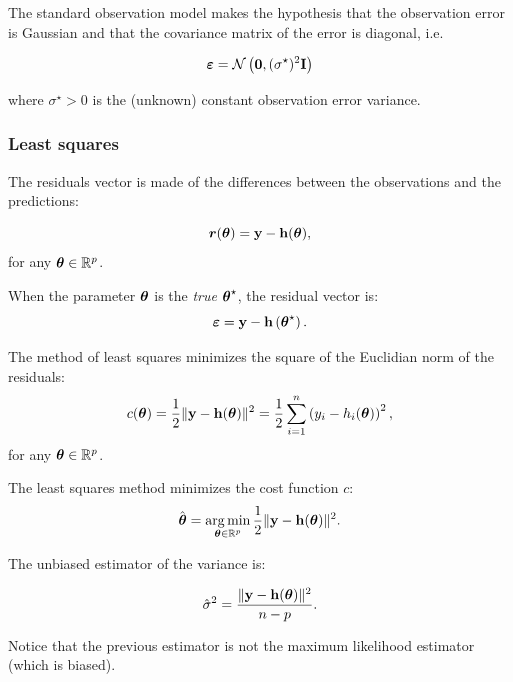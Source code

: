 \documentclass{beamer}
\begin{document}

\begin{frame}
The standard observation model makes the hypothesis that the 
observation error is Gaussian and that the covariance
matrix of the error is diagonal, i.e.

$$
\boldsymbol{\varepsilon} = \mathcal{N}\left({\bf 0}, (\sigma^\star)^2 {\bf I}\right)
$$

where $\sigma^\star > 0$ is the (unknown) constant observation error
variance.

\end{frame}


\begin{frame}
\frametitle{Least squares}

The residuals vector is made of the differences between the observations 
and the predictions:

$$
\boldsymbol{r}(\boldsymbol{\theta}) = {\bf y} - {\bf h}(\boldsymbol{\theta}),
$$
for any $\boldsymbol{\theta} \in\mathbb{R}^p$. 

When the parameter $\boldsymbol{\theta}$ is the \emph{true} $\boldsymbol{\theta}^\star$, the residual 
vector is:
$$
\boldsymbol{\varepsilon} = {\bf y} - {\bf h}\left(\boldsymbol{\theta}^\star\right).
$$


The method of least squares minimizes the square
of the Euclidian norm of the residuals:
$$
c(\boldsymbol{\theta}) 
= \frac{1}{2} \|{\bf y} - {\bf h}(\boldsymbol{\theta})\|^2 
= \frac{1}{2} \sum_{i=1}^n \left( y_i - h_i(\boldsymbol{\theta}) \right)^2,
$$
for any $\boldsymbol{\theta} \in \mathbb{R}^p$.


\end{frame}


\begin{frame}
The least squares method minimizes the cost function $c$:
$$
\hat{\boldsymbol{\theta}} 
= \operatorname*{arg\,min}_{\boldsymbol{\theta} \in \mathbb{R}^p} \frac{1}{2} \|{\bf y} - {\bf h}(\boldsymbol{\theta})\|^2.
$$

The unbiased estimator of the variance is:

$$
\hat{\sigma}^2 = \frac{\|{\bf y} - {\bf h}(\boldsymbol{\theta})\|^2}{n - p}.
$$

Notice that the previous estimator is not the maximum likelihood
estimator (which is biased).
\end{frame}

\end{document}
